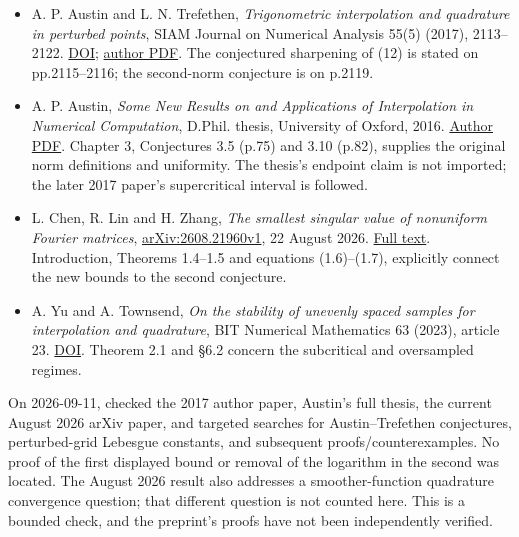 \documentclass[11pt,a4paper]{article}
\providecommand{\tightlist}{\setlength{\itemsep}{0pt}\setlength{\parskip}{0pt}}
\begin{document}
\begin{itemize}
\tightlist
\item
  A. P. Austin and L. N. Trefethen, \emph{Trigonometric interpolation
  and quadrature in perturbed points}, SIAM Journal on Numerical
  Analysis 55(5) (2017), 2113--2122.
  \href{https://doi.org/10.1137/16M1107760}{DOI};
  \href{https://people.maths.ox.ac.uk/trefethen/perturbed.pdf}{author
  PDF}. The conjectured sharpening of (12) is stated on pp.2115--2116;
  the second-norm conjecture is on p.2119.
\item
  A. P. Austin, \emph{Some New Results on and Applications of
  Interpolation in Numerical Computation}, D.Phil. thesis, University of
  Oxford, 2016.
  \href{https://personal.math.vt.edu/apaustin/pubs/DPhilThesis.pdf}{Author
  PDF}. Chapter 3, Conjectures 3.5 (p.75) and 3.10 (p.82), supplies the
  original norm definitions and uniformity. The thesis's endpoint claim
  is not imported; the later 2017 paper's supercritical interval is
  followed.
\item
  L. Chen, R. Lin and H. Zhang, \emph{The smallest singular value of
  nonuniform Fourier matrices},
  \href{https://arxiv.org/abs/2608.21960v1}{arXiv:2608.21960v1}, 22
  August 2026. \href{https://arxiv.org/html/2608.21960v1}{Full text}.
  Introduction, Theorems 1.4--1.5 and equations (1.6)--(1.7), explicitly
  connect the new bounds to the second conjecture.
\item
  A. Yu and A. Townsend, \emph{On the stability of unevenly spaced
  samples for interpolation and quadrature}, BIT Numerical Mathematics
  63 (2023), article 23.
  \href{https://doi.org/10.1007/s10543-023-00965-z}{DOI}. Theorem 2.1
  and §6.2 concern the subcritical and oversampled regimes.
\end{itemize}

On 2026-09-11, checked the 2017 author paper, Austin's full thesis, the
current August 2026 arXiv paper, and targeted searches for
Austin--Trefethen conjectures, perturbed-grid Lebesgue constants, and
subsequent proofs/counterexamples. No proof of the first displayed bound
or removal of the logarithm in the second was located. The August 2026
result also addresses a smoother-function quadrature convergence
question; that different question is not counted here. This is a bounded
check, and the preprint's proofs have not been independently verified.
\end{document}
